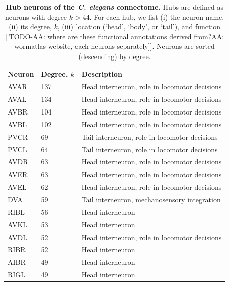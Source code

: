 \documentclass[10pt,letterpaper]{article}
\begin{document}
{\begin{table}[h]
\begin{adjustwidth}{-2.25in}{}
\centering
\caption{\textbf{Hub neurons of the \textit{C. elegans} connectome.}
Hubs are defined as neurons with degree $k > 44$.
For each hub, we list (i) the neuron name, (ii) its degree, $k$, (iii) location (`head', `body', or `tail'), and function [[TODO-AA: where are these functional annotations derived from?AA: wormatlas website, each neurons separately]].
Neurons are sorted (descending) by degree.}
\label{tab:HubList}
\begin{tabular}{lll}
\hline
\textbf{Neuron} & \textbf{Degree, $k$} & \textbf{Description}                    \\ \hline
AVAR   & 137        & Head interneuron, role in locomotor decisions                \\
AVAL   & 134        & Head interneuron, role in locomotor decisions                \\
AVBR   & 104        & Head interneuron, role in locomotor decisions                \\
AVBL   & 102        & Head interneuron, role in locomotor decisions                \\
PVCR   & 69         & Tail interneuron, role in locomotor decisions                \\
PVCL   & 64         & Tail interneuron, role in locomotor decisions                \\
AVDR   & 63         & Head interneuron, role in locomotor decisions 				\\
AVER   & 63         & Head interneuron, role in locomotor decisions                \\
AVEL   & 62         & Head interneuron, role in locomotor decisions                \\
DVA    & 59         & Tail interneuron, mechanosensory integration               \\
RIBL   & 56         & Head interneuron                							\\
AVKL   & 53         & Head interneuron                                             \\
AVDL   & 52         & Head interneuron, role in locomotor decisions                 \\
RIBR   & 52         & Head interneuron                                             \\
AIBR   & 49         & Head interneuron                                             \\
RIGL   & 49         & Head interneuron                                             \\\hline
\end{tabular}
\end{adjustwidth}
\end{table}



}
\end{document}
